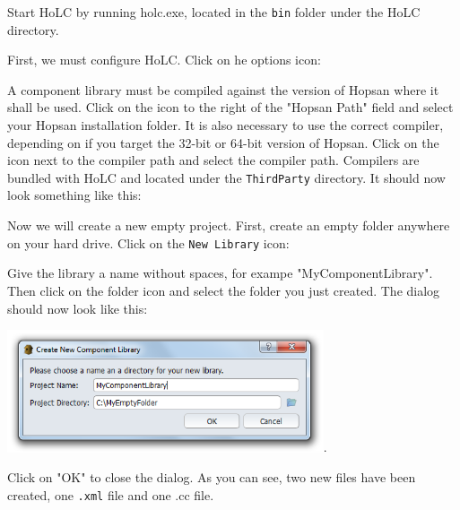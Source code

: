 \documentclass[a4paper,pdftex]{article}
\begin{document}
\begin{tutenumerate}
Start HoLC by running holc.exe, located in the \texttt{bin} folder under the HoLC directory.

First, we must configure HoLC. Click on he options icon:


A component library must be compiled against the version of Hopsan where it shall be used. 
Click on the icon to the right of the "Hopsan Path" field and select your Hopsan installation folder.
It is also necessary to use the correct compiler, depending on if you target the 32-bit or 64-bit version of Hopsan.
Click on the icon next to the compiler path and select the compiler path. 
Compilers are bundled with HoLC and located under the \texttt{ThirdParty} directory.
It should now look something like this:


Now we will create a new empty project. 
First, create an empty folder anywhere on your hard drive.
Click on the \texttt{New Library} icon:


Give the library a name without spaces, for exampe "MyComponentLibrary".
Then click on the folder icon and select the folder you just created.
The dialog should now look like this:

\includegraphics[width=0.7\textwidth]{gfx/writingcomponents/newlibrarydialog.png}.

Click on "OK" to close the dialog.
As you can see, two new files have been created, one \texttt{.xml} file and one .cc file.


\end{tutenumerate}
\end{document}

